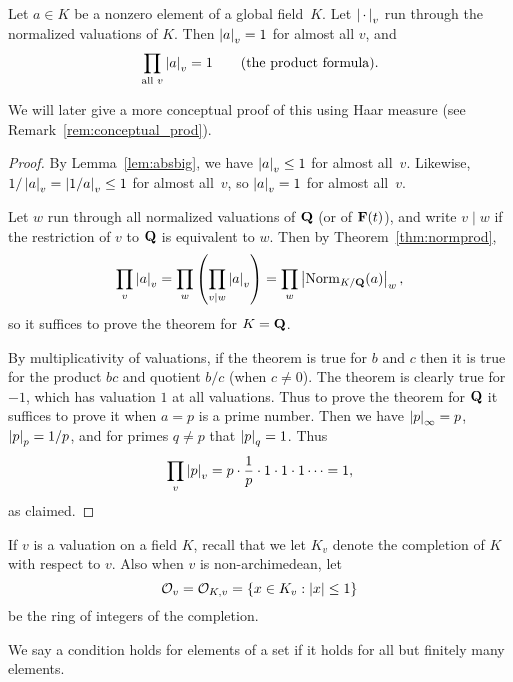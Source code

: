 \begin{theorem}\label{thm:product_formula}
Let $a\in K$ be a nonzero element of a global field~$K$.
Let $\left|\,\cdot\,\right|_v$ run through the normalized valuations
of $K$.  Then $\left|a\right|_v=1$ for almost all $v$, and 
$$
\prod_{\text{\rm all }v} \left|a\right|_v = 1\qquad{\text{\rm (the product
    formula).}}
$$
\end{theorem}
We will later give a more conceptual proof of this
using Haar measure (see Remark~\ref{rem:conceptual_prod}).
\begin{proof}
By Lemma~\ref{lem:absbig}, we have $\left|a\right|_v\leq 1$
for almost all~$v$.  Likewise, $1/\left|a\right|_v = \left|1/a\right|_v\leq 1$
for almost all~$v$, so $\left|a\right|_v = 1$ for almost all~$v$.

Let $w$ run through all normalized valuations of $\mathbf{Q}$ (or of $\mathbf{F}(t)$),
and write $v\mid w$ if the restriction of $v$ to $\mathbf{Q}$ is equivalent to $w$.
Then by Theorem~\ref{thm:normprod},
$$
 \prod_{v} \left|a\right|_v = \prod_w \left(\prod_{v\mid w} \left|a\right|_v\right)
     = \prod_w \left|\operatorname{Norm}_{K/\mathbf{Q}}(a)\right|_w,
$$
so it suffices to prove the theorem for $K=\mathbf{Q}$.

By multiplicativity of valuations, if the theorem is true for $b$ and
$c$ then it is true for the product $b c$ and quotient $b/c$ (when
$c\neq 0$). The theorem is clearly true for $-1$, which has valuation
$1$ at all valuations.  Thus to prove the theorem for $\mathbf{Q}$ it suffices
to prove it when $a=p$ is a prime number.  Then we have
$\left|p\right|_\infty = p$, $\left|p\right|_p = 1/p$, and for primes $q\neq p$ that
$\left|p\right|_q = 1$.  Thus
$$\prod_v \left|p\right|_v = p \cdot \frac{1}{p} \cdot 1 \cdot 1 \cdot 1 \cdots = 1,$$
as claimed.
\end{proof}


If $v$ is a valuation on a field $K$, recall that 
we let $K_v$ denote the completion of $K$ with respect to $v$. Also when
$v$ is non-archimedean, let
$$
  \mathcal{O}_v = \mathcal{O}_{K,v} = \{x \in K_v : \left|x\right| \leq 1\}
$$
be the ring of integers of the completion. 

\begin{definition}
We say a condition holds for  elements
of a set if it holds for all but finitely many elements.
\end{definition}

